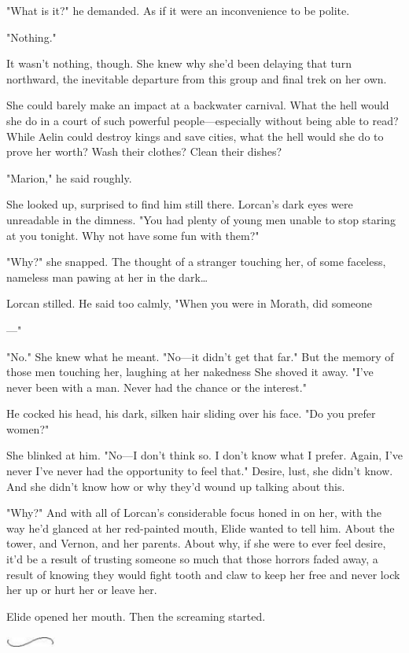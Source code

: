 "What is it?" he demanded. As if it were an inconvenience to be polite.

"Nothing."

It wasn't nothing, though. She knew why she'd been delaying that turn northward, the inevitable departure from this group and final trek on her own.

She could barely make an impact at a backwater carnival. What the hell would she do in a court of such powerful people---especially without being able to read? While Aelin could destroy kings and save cities, what the hell would she do to prove her worth? Wash their clothes? Clean their dishes?

"Marion," he said roughly.

She looked up, surprised to find him still there. Lorcan's dark eyes were unreadable in the dimness. "You had plenty of young men unable to stop staring at you tonight. Why not have some fun with them?"

"Why?" she snapped. The thought of a stranger touching her, of some faceless, nameless man pawing at her in the dark\ldots{}

Lorcan stilled. He said too calmly, "When you were in Morath, did someone

---"

"No." She knew what he meant. "No---it didn't get that far." But the memory of those men touching her, laughing at her nakedness  She shoved it away. "I've never been with a man. Never had the chance or the interest."

He cocked his head, his dark, silken hair sliding over his face. "Do you prefer women?"

She blinked at him. "No---I don't think so. I don't know what I prefer. Again, I've never  I've never had the opportunity to feel
 that." Desire, lust, she didn't know. And she didn't know how or why they'd wound up talking about this.

"Why?" And with all of Lorcan's considerable focus honed in on her, with the way he'd glanced at her red-painted mouth, Elide wanted to tell him. About the tower, and Vernon, and her parents. About why, if she were to ever feel desire, it'd be a result of trusting someone so much that those horrors faded away, a result of knowing they would fight tooth and claw to keep her free and never lock her up or hurt her or leave her.

Elide opened her mouth. Then the screaming started.

\includegraphics[width=0.65in,height=0.13in]{images/seperator}

